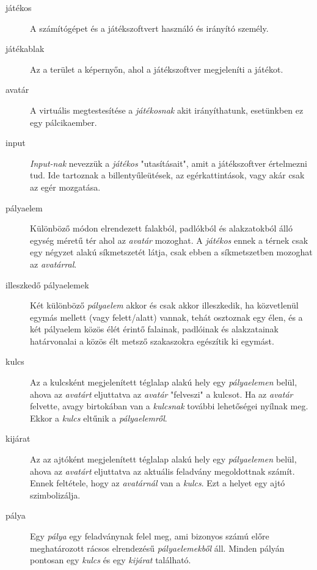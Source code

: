 \begin{description}

\item[játékos]
A számítógépet és a játékszoftvert használó és irányító személy.

\item[játékablak]
Az a terület a képernyőn, ahol a játékszoftver megjeleníti a játékot.

\item[avatár]
A virtuális megtestesítése a \emph{játékosnak} akit irányíthatunk, esetünkben ez egy pálcikaember.

\item[input]
\emph{Input-nak} nevezzük a \emph{játékos} "utasításait", amit a játékszoftver értelmezni tud. Ide tartoznak a billentyűleütések, az egérkattintások, vagy akár csak az egér mozgatása.



\item[pályaelem]
Különböző módon elrendezett falakból, padlókból és alakzatokból álló egység méretű tér ahol az \emph{avatár} mozoghat. A \emph{játékos} ennek a térnek csak egy négyzet alakú síkmetszetét látja, csak ebben a síkmetszetben mozoghat az \emph{avatárral}.

\item[illeszkedő pályaelemek]
Két különböző \emph{pályaelem} akkor és csak akkor illeszkedik, ha közvetlenül egymás mellett (vagy felett/alatt) vannak, tehát osztoznak egy élen, és a két pályaelem közös élét érintő falainak, padlóinak és alakzatainak határvonalai a közös élt metsző szakaszokra egészítik ki egymást.

\item[kulcs]
Az a kulcsként megjelenített téglalap alakú hely egy \emph{pályaelemen} belül, ahova az \emph{avatárt} eljuttatva az \emph{avatár} "felveszi" a kulcsot. Ha az \emph{avatár} felvette, avagy birtokában van a \emph{kulcsnak} további lehetőségei nyílnak meg. Ekkor a \emph{kulcs} eltűnik a \emph{pályaelemről}.

\item[kijárat]
Az az ajtóként megjelenített téglalap alakú hely egy \emph{pályaelemen} belül, ahova az \emph{avatárt} eljuttatva az aktuális feladvány megoldottnak számít. Ennek feltétele, hogy az \emph{avatárnál} van a \emph{kulcs}. Ezt a helyet egy ajtó szimbolizálja.

\item[pálya]
Egy \emph{pálya} egy feladványnak felel meg, ami bizonyos számú előre meghatározott rácsos elrendezésű \emph{pályaelemekből} áll. Minden pályán pontosan egy \emph{kulcs} és egy \emph{kijárat} található.


\end{description}
